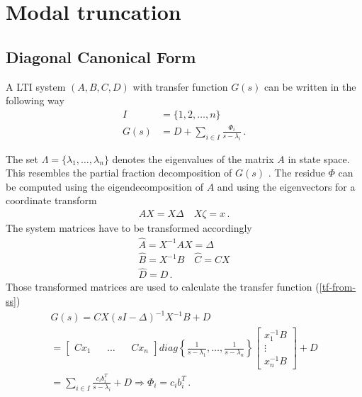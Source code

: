 \section{Modal truncation}
\subsection{Diagonal Canonical Form} \label{secdcnf}
A LTI system \((A, B, C, D)\) with transfer function \(G(s)\) can be written in the following way
\begin{align}
I &= \{1, 2, \hdots, n\} \\
G(s) &= D + \sum_{i \in I} \frac{\Phi_i}{s-\lambda_i} \,. \label{dcnf}
\end{align}

The set \(\Lambda = \{\lambda_1, \hdots, \lambda_n\}\) denotes the eigenvalues of the matrix \(A\) in state space.
This resembles the partial fraction decomposition of \(G(s)\) \cite{vuillemin2020optimal}.
The residue \(\Phi\) can be computed using the eigendecomposition of \(A\) and using the eigenvectors for a coordinate transform
\begin{gather}
AX = X\Delta \quad X \zeta =  x  \,.
\end{gather}
The system matrices have to be transformed accordingly
\begin{gather}
\hat{A} = X^{-1}AX = \Delta \\
\hat{B} = X^{-1}B \quad \hat{C} = CX \\
\hat{D} = D \,.
\end{gather}
Those transformed matrices are used to calculate the transfer function (\ref{tf-from-ss})
\begin{gather}
G(s) = CX(sI - \Delta)^{-1}X^{-1}B + D\\
= \begin{bmatrix}
C x_1 && \hdots && Cx_n
\end{bmatrix} diag\left\{\frac{1}{s-\lambda_1}, \hdots, \frac{1}{s-\lambda_n}\right\} \begin{bmatrix}
x_1^{-1}B \\
\vdots \\
x_n^{-1}B
\end{bmatrix} + D \\
= \sum_{i \in I} \frac{c_i b_i^{T}}{s - \lambda_i}  + D
\Rightarrow \Phi_i = c_i b_i^{T} \,.
\end{gather}
\cite{Benner}

